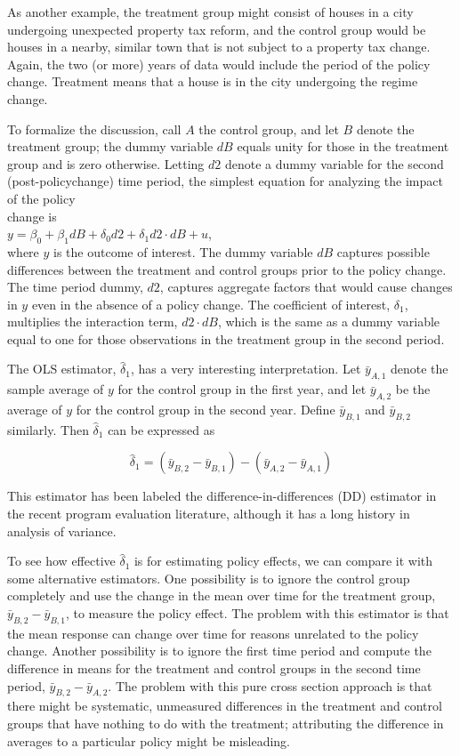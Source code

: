 \documentclass[10pt]{article}
\begin{document}
As another example, the treatment group might consist of houses in a city undergoing unexpected property tax reform, and the control group would be houses in a nearby, similar town that is not subject to a property tax change. Again, the two (or more) years of data would include the period of the policy change. Treatment means that a house is in the city undergoing the regime change.

To formalize the discussion, call $A$ the control group, and let $B$ denote the treatment group; the dummy variable $d B$ equals unity for those in the treatment group and is zero otherwise. Letting $d 2$ denote a dummy variable for the second (post-policychange) time period, the simplest equation for analyzing the impact of the policy\\
change is\\
$y=\beta_{0}+\beta_{1} d B+\delta_{0} d 2+\delta_{1} d 2 \cdot d B+u$,\\
where $y$ is the outcome of interest. The dummy variable $d B$ captures possible differences between the treatment and control groups prior to the policy change. The time period dummy, $d 2$, captures aggregate factors that would cause changes in $y$ even in the absence of a policy change. The coefficient of interest, $\delta_{1}$, multiplies the interaction term, $d 2 \cdot d B$, which is the same as a dummy variable equal to one for those observations in the treatment group in the second period.

The OLS estimator, $\hat{\delta}_{1}$, has a very interesting interpretation. Let $\bar{y}_{A, 1}$ denote the sample average of $y$ for the control group in the first year, and let $\bar{y}_{A, 2}$ be the average of $y$ for the control group in the second year. Define $\bar{y}_{B, 1}$ and $\bar{y}_{B, 2}$ similarly. Then $\hat{\delta}_{1}$ can be expressed as


\begin{equation*}
\hat{\delta}_{1}=\left(\bar{y}_{B, 2}-\bar{y}_{B, 1}\right)-\left(\bar{y}_{A, 2}-\bar{y}_{A, 1}\right) \tag{6.53}
\end{equation*}


This estimator has been labeled the difference-in-differences (DD) estimator in the recent program evaluation literature, although it has a long history in analysis of variance.

To see how effective $\hat{\delta}_{1}$ is for estimating policy effects, we can compare it with some alternative estimators. One possibility is to ignore the control group completely and use the change in the mean over time for the treatment group, $\bar{y}_{B, 2}-\bar{y}_{B, 1}$, to measure the policy effect. The problem with this estimator is that the mean response can change over time for reasons unrelated to the policy change. Another possibility is to ignore the first time period and compute the difference in means for the treatment and control groups in the second time period, $\bar{y}_{B, 2}-\bar{y}_{A, 2}$. The problem with this pure cross section approach is that there might be systematic, unmeasured differences in the treatment and control groups that have nothing to do with the treatment; attributing the difference in averages to a particular policy might be misleading.
\end{document}
